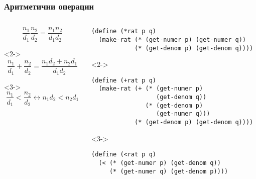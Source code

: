 \documentclass{beamer}
\begin{document}
\begin{frame}[fragile]
  \frametitle{Аритметични операции}
  \small
  \begin{columns}[t,onlytextwidth]
    \begin{column}{0.33\textwidth}
      \vspace{2em}
      \begin{equation*}
        \frac{n_1}{d_1}\frac{n_2}{d_2} = \frac{n_1n_2}{d_1d_2}
      \end{equation*}
      \vspace{4em}
      \begin{uncoverenv}<2->
        \begin{equation*}
          \frac{n_1}{d_1} + \frac{n_2}{d_2} = \frac{n_1d_2 + n_2d_1}{d_1d_2}
        \end{equation*}
      \end{uncoverenv}
      \vspace{4em}
      \begin{uncoverenv}<3->
        \begin{equation*}
          \frac{n_1}{d_1} < \frac{n_2}{d_2} \leftrightarrow n_1d_2 < n_2d_1
        \end{equation*}
      \end{uncoverenv}
    \end{column}

    \begin{column}{0.67\textwidth}
\begin{verbatim}
(define (*rat p q)
  (make-rat (* (get-numer p) (get-numer q))
            (* (get-denom p) (get-denom q))))
\end{verbatim}
      \begin{uncoverenv}<2->
\begin{verbatim}
(define (+rat p q)
  (make-rat (+ (* (get-numer p)
                  (get-denom q))
               (* (get-denom p)
                  (get-numer q)))
            (* (get-denom p) (get-denom q))))
\end{verbatim}
      \end{uncoverenv}
      \begin{uncoverenv}<3->
\begin{verbatim}
(define (<rat p q)
  (< (* (get-numer p) (get-denom q))
     (* (get-numer q) (get-denom p))))
\end{verbatim}
      \end{uncoverenv}
    \end{column}
  \end{columns}
\end{frame}
\end{document}
